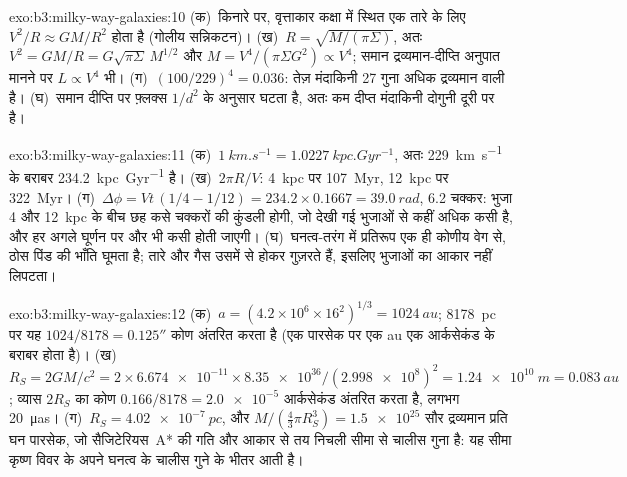 \begin{solution}{exo:b3:milky-way-galaxies:10}
(क)~किनारे पर, वृत्ताकार कक्षा में स्थित एक तारे के लिए $V^2/R \approx GM/R^2$
होता है (गोलीय सन्निकटन)। (ख)~$R = \sqrt{M/(\pi\Sigma)}$, अतः $V^2 =
GM/R = G\sqrt{\pi\Sigma}\,M^{1/2}$ और $M = V^4/(\pi\Sigma G^2) \propto
V^4$; समान द्रव्यमान-दीप्ति अनुपात मानने पर $L \propto V^4$ भी।
(ग)~$(100/229)^4 = \num{0.036}$: तेज़ मंदाकिनी
27 गुना अधिक द्रव्यमान वाली है। (घ)~समान दीप्ति पर फ़्लक्स $1/d^2$ के अनुसार घटता है, अतः कम दीप्त
मंदाकिनी दोगुनी दूरी पर है।
\end{solution}

\begin{solution}{exo:b3:milky-way-galaxies:11}
(क)~$\qty{1}{km.s^{-1}} = \qty{1.0227}{kpc.Gyr^{-1}}$, अतः
\qty{229}{km.s^{-1}} के बराबर \qty{234.2}{kpc.Gyr^{-1}} है। (ख)~$2\pi R/V$:
\qty{4}{kpc} पर \qty{107}{Myr}, \qty{12}{kpc} पर \qty{322}{Myr}।
(ग)~$\Delta\phi = Vt\,(1/4 - 1/12) = 234.2\times0.1667 = \qty{39.0}{rad}$,
6.2 चक्कर: भुजा 4 और
\qty{12}{kpc} के बीच छह कसे चक्करों की कुंडली होगी, जो देखी गई भुजाओं से कहीं अधिक कसी है, और हर अगले
घूर्णन पर और भी कसी होती जाएगी। (घ)~घनत्व-तरंग में प्रतिरूप
एक ही कोणीय वेग से, ठोस पिंड की भाँति घूमता है; तारे और गैस उसमें से होकर गुज़रते हैं, इसलिए
भुजाओं का आकार नहीं लिपटता।
\end{solution}

\begin{solution}{exo:b3:milky-way-galaxies:12}
(क)~$a = (4.2\times10^6\times16^2)^{1/3} = \qty{1024}{au}$;
\qty{8178}{pc} पर यह $1024/8178 = \ang{;;0.125}$ कोण अंतरित करता है
(एक पारसेक पर एक au एक आर्कसेकंड के बराबर होता है)। (ख)~$R_S = 2GM/c^2 = 2\times\num{6.674e-11}
\times\num{8.35e36}/(\num{2.998e8})^2 = \qty{1.24e10}{m} = \qty{0.083}{au}$;
व्यास $2R_S$ का कोण $0.166/8178 = \num{2.0e-5}$ आर्कसेकंड अंतरित करता है, लगभग
\qty{20}{\micro as}। (ग)~$R_S = \qty{4.02e-7}{pc}$, और $M/(\tfrac43\pi
R_S^3) = \num{1.5e25}$ सौर द्रव्यमान प्रति घन पारसेक, जो
सैजिटेरियस~A* की गति और आकार से तय निचली सीमा से चालीस गुना है:
यह सीमा कृष्ण विवर के अपने घनत्व के चालीस गुने के भीतर आती है।
\end{solution}


